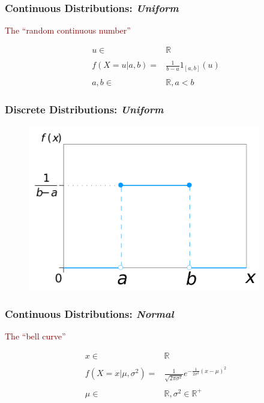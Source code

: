 \documentclass[xcolor={dvipsnames}]{beamer}
\begin{document}
\frame
{
 \frametitle{Continuous Distributions: \emph{Uniform}}
 
 \Large

\textcolor{Maroon}{The ``random continuous number''}

\LARGE
 
 \begin{align*}
u \in {} & \mathbb{R} \\\\
f(X=u|a,b) = {} & \frac{1}{b-a} 1_{[a,b]}(u)\\\\
a,b \in {} & \mathbb{R}, a < b
\end{align*}

}



\frame
{
 \frametitle{Discrete Distributions: \emph{Uniform} }
 
\begin{figure}
\centering
\includegraphics[width=4in]{stuff/uniform.png}
\end{figure}
}



\frame
{
 \frametitle{Continuous Distributions: \emph{Normal}}
 
 \Large

\textcolor{Maroon}{The ``bell curve''}

\LARGE
 
\begin{align*}
x \in {} & \mathbb{R} \\\\
f(X=x|\mu,\sigma^2) = {} & \frac{1}{\sqrt{2\pi \sigma^2}} e^{-\frac{1}{2\sigma^2}(x-\mu)^2}\\\\
\mu \in {} & \mathbb{R}, \sigma^2 \in \mathbb{R}^+
\end{align*}
 
}
\end{document}
